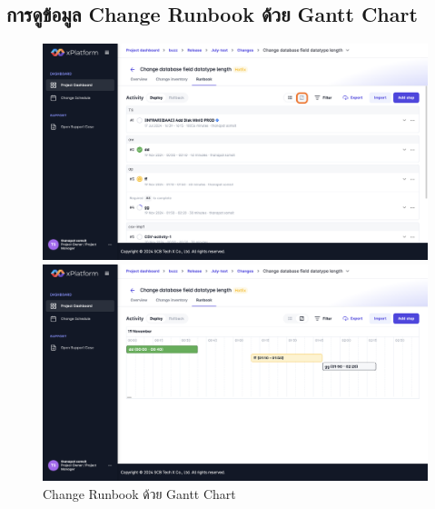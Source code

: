 \subsection{การดูข้อมูล Change Runbook ด้วย Gantt Chart}
\begin{figure}[H]
    \begin{center}
        \includegraphics[width=\linewidth]{resources/pages/change-runbook/gantt-chart/39.png}
    
        \vspace{1in}
    
        \includegraphics[width=\linewidth]{resources/pages/change-runbook/gantt-chart/40.png}
    \end{center}
    \caption[Change Runbook ด้วย Gantt Chart]{Change Runbook ด้วย Gantt Chart}
  \label{fig:gantt-chart}
\end{figure}

\newpage

